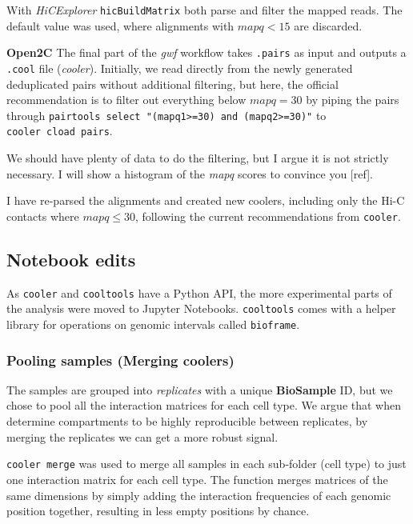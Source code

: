 \documentclass[
  11pt,
  a4paper,
]{scrbook}
\let\oldemph\emph
\renewcommand\emph[1]{\oldemph{\color{gray}#1}}
\begin{document}
With \emph{HiCExplorer} \texttt{hicBuildMatrix} both parse and filter
the mapped reads. The default value was used, where alignments with
\(mapq < 15\) are discarded.

\textbf{Open2C} The final part of the \emph{gwf} workflow takes
\texttt{.pairs} as input and outputs a \texttt{.cool} file
(\emph{cooler}). Initially, we read directly from the newly generated
deduplicated pairs without additional filtering, but here, the official
recommendation is to filter out everything below \(mapq = 30\) by piping
the pairs through
\texttt{pairtools\ select\ "(mapq1\textgreater{}=30)\ and\ (mapq2\textgreater{}=30)"}
to \texttt{cooler\ cload\ pairs}.

We should have plenty of data to do the filtering, but I argue it is not
strictly necessary. I will show a histogram of the \emph{mapq} scores to
convince you {[}ref{]}.

I have re-parsed the alignments and created new coolers, including only
the Hi-C contacts where \(mapq \leq 30\), following the current
recommendations from \texttt{cooler}.

\subsection{Notebook edits}\label{notebook-edits}

As \texttt{cooler} and \texttt{cooltools} have a Python API, the more
experimental parts of the analysis were moved to Jupyter Notebooks.
\texttt{cooltools} comes with a helper library for operations on genomic
intervals called \texttt{bioframe}.

\subsubsection{Pooling samples (Merging
coolers)}\label{pooling-samples-merging-coolers}

The samples are grouped into \emph{replicates} with a unique
\textbf{BioSample} ID, but we chose to pool all the interaction matrices
for each cell type. We argue that when \citet{wang_reprogramming_2019}
determine compartments to be highly reproducible between replicates, by
merging the replicates we can get a more robust signal.

\texttt{cooler\ merge} was used to merge all samples in each sub-folder
(cell type) to just one interaction matrix for each cell type. The
function merges matrices of the same dimensions by simply adding the
interaction frequencies of each genomic position together, resulting in
less empty positions by chance.
\end{document}
